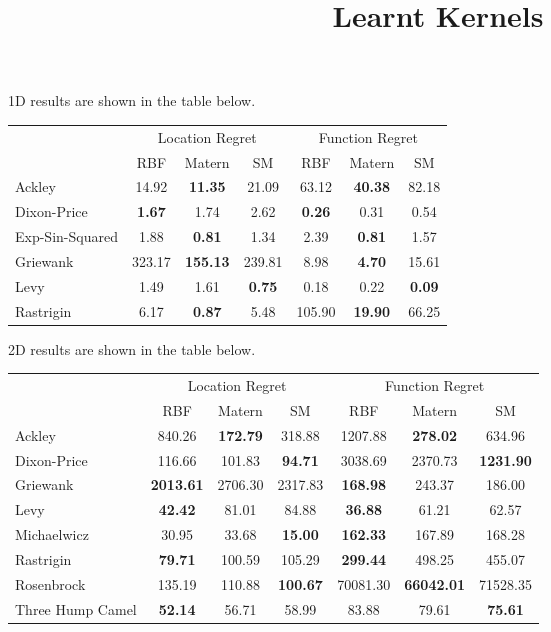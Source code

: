 \documentclass{article}
\title{Learnt Kernels}
\begin{document}
\maketitle

1D results are shown in the table below.
\begin{center}
\begin{tabular}{ | l | c | c | c | c | c | c |}
\hline
& \multicolumn{3}{|c|}{Location Regret} & \multicolumn{3}{|c|}{Function Regret} \\
\cline{2-7}
& RBF & Matern & SM & RBF & Matern & SM \\
\hline
Ackley & 14.92 & \textbf{11.35} & 21.09 & 63.12 & \textbf{40.38} & 82.18 \\
\hline
Dixon-Price & \textbf{1.67} & 1.74 & 2.62 & \textbf{0.26} & 0.31 & 0.54 \\
\hline
Exp-Sin-Squared & 1.88 & \textbf{0.81} & 1.34 & 2.39 & \textbf{0.81} & 1.57 \\
\hline
Griewank & 323.17 & \textbf{155.13} & 239.81 & 8.98 & \textbf{4.70} & 15.61 \\
\hline
Levy & 1.49 & 1.61 & \textbf{0.75} & 0.18 & 0.22 & \textbf{0.09} \\
\hline
Rastrigin & 6.17 & \textbf{0.87} & 5.48 & 105.90 & \textbf{19.90} & 66.25 \\
\hline
\end{tabular}
\end{center}

2D results are shown in the table below.
\begin{center}
\begin{tabular}{ | l | c | c | c | c | c | c |}
\hline
& \multicolumn{3}{|c|}{Location Regret} & \multicolumn{3}{|c|}{Function Regret} \\
\cline{2-7}
& RBF & Matern & SM & RBF & Matern & SM \\
\hline
Ackley & 840.26 & \textbf{172.79} & 318.88 & 1207.88 & \textbf{278.02} & 634.96 \\
\hline
Dixon-Price & 116.66 & 101.83 & \textbf{94.71} & 3038.69 & 2370.73 & \textbf{1231.90} \\
\hline
Griewank & \textbf{2013.61} & 2706.30 & 2317.83 & \textbf{168.98} & 243.37 & 186.00 \\
\hline
Levy & \textbf{42.42} & 81.01 & 84.88 & \textbf{36.88} & 61.21 & 62.57 \\
\hline
Michaelwicz & 30.95 & 33.68 & \textbf{15.00} & \textbf{162.33} & 167.89 & 168.28 \\
\hline
Rastrigin & \textbf{79.71} & 100.59 & 105.29 & \textbf{299.44} & 498.25 & 455.07 \\
\hline
Rosenbrock & 135.19 & 110.88 & \textbf{100.67} & 70081.30 & \textbf{66042.01} & 71528.35 \\
\hline
Three Hump Camel & \textbf{52.14} & 56.71 & 58.99 & 83.88 & 79.61 & \textbf{75.61} \\
\hline
\end{tabular}
\end{center}
\end{document}

